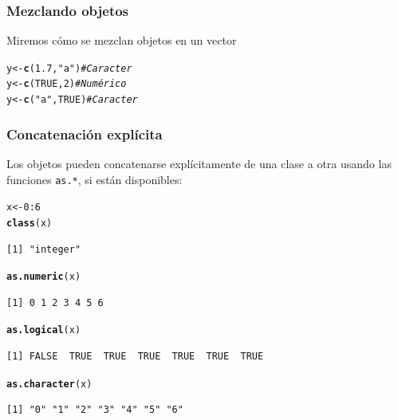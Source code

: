 \documentclass{article}\usepackage[]{graphicx}\usepackage[]{color}
\makeatletter
\newcommand{\hlnum}[1]{\textcolor[rgb]{0.686,0.059,0.569}{#1}}%
\newcommand{\hlstr}[1]{\textcolor[rgb]{0.192,0.494,0.8}{#1}}%
\newcommand{\hlcom}[1]{\textcolor[rgb]{0.678,0.584,0.686}{\textit{#1}}}%
\newcommand{\hlopt}[1]{\textcolor[rgb]{0,0,0}{#1}}%
\newcommand{\hlstd}[1]{\textcolor[rgb]{0.345,0.345,0.345}{#1}}%
\newcommand{\hlkwb}[1]{\textcolor[rgb]{0.69,0.353,0.396}{#1}}%
\newcommand{\hlkwd}[1]{\textcolor[rgb]{0.737,0.353,0.396}{\textbf{#1}}}%
\newenvironment{kframe}{%
 \def\at@end@of@kframe{}%
 \ifinner\ifhmode%
  \def\at@end@of@kframe{\end{minipage}}%
  \begin{minipage}{\columnwidth}%
 \fi\fi%
 \def\FrameCommand##1{\hskip\@totalleftmargin \hskip-\fboxsep
 \colorbox{shadecolor}{##1}\hskip-\fboxsep
     \hskip-\linewidth \hskip-\@totalleftmargin \hskip\columnwidth}%
 \MakeFramed {\advance\hsize-\width
   \@totalleftmargin\z@ \linewidth\hsize
   \@setminipage}}%
 {\par\unskip\endMakeFramed%
 \at@end@of@kframe}
\newenvironment{knitrout}{}{} %
\makeatother
\begin{document}
    \subsubsection{Mezclando objetos}
      Miremos cómo se mezclan objetos en un vector
\begin{knitrout}
\color{fgcolor}\begin{kframe}
\begin{alltt}
  \hlstd{y} \hlkwb{<-} \hlkwd{c}\hlstd{(}\hlnum{1.7}\hlstd{,} \hlstr{"a"}\hlstd{)}    \hlcom{# Caracter}
  \hlstd{y} \hlkwb{<-} \hlkwd{c}\hlstd{(}\hlnum{TRUE}\hlstd{,} \hlnum{2}\hlstd{)}     \hlcom{# Numérico}
  \hlstd{y} \hlkwb{<-} \hlkwd{c}\hlstd{(}\hlstr{"a"}\hlstd{,} \hlnum{TRUE}\hlstd{)}   \hlcom{# Caracter}
\end{alltt}
\end{kframe}
\end{knitrout}

    \subsubsection{Concatenación explícita}
      Los objetos pueden concatenarse explícitamente de una clase a otra usando las funciones \texttt{as.*}, si están disponibles:
\begin{knitrout}
\color{fgcolor}\begin{kframe}
\begin{alltt}
  \hlstd{x} \hlkwb{<-} \hlnum{0}\hlopt{:}\hlnum{6}
  \hlkwd{class}\hlstd{(x)}
\end{alltt}
\begin{verbatim}
[1] "integer"
\end{verbatim}
\begin{alltt}
  \hlkwd{as.numeric}\hlstd{(x)}
\end{alltt}
\begin{verbatim}
[1] 0 1 2 3 4 5 6
\end{verbatim}
\begin{alltt}
  \hlkwd{as.logical}\hlstd{(x)}
\end{alltt}
\begin{verbatim}
[1] FALSE  TRUE  TRUE  TRUE  TRUE  TRUE  TRUE
\end{verbatim}
\begin{alltt}
  \hlkwd{as.character}\hlstd{(x)}
\end{alltt}
\begin{verbatim}
[1] "0" "1" "2" "3" "4" "5" "6"
\end{verbatim}
\end{kframe}
\end{knitrout}
\end{document}

